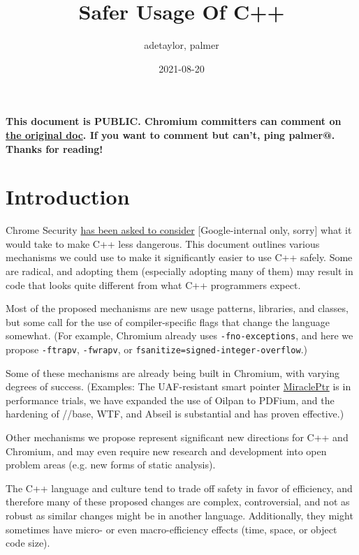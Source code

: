 \documentclass[a4paper,12pt,notitlepage,twoside,openright]{article}
\title{Safer Usage Of C++}
\author{adetaylor, palmer}
\date{2021-08-20}
\begin{document}
\maketitle

\textbf{This document is PUBLIC. Chromium committers can comment
on \href{https://www.google.com/url?q=https://docs.google.com/document/d/1eVKfIsPsEVDsBS24ErmuyjNy-9zSBzHgp4Sk6fs6OOI/edit\%23\&sa=D\&source=editors\&ust=1631944129012000\&usg=AOvVaw0F0RgfJgUo0h2Qa_7lRJLS}{the
original doc}. If you want to comment but can't, ping palmer@. Thanks
for reading!}

\section{Introduction}

Chrome
Security \href{https://www.google.com/url?q=https://docs.google.com/document/d/1JWGI-fkEsdRPpwPtS6x3siNtHX8cWoZeiWD6_y781ag/edit\&sa=D\&source=editors\&ust=1631944129014000\&usg=AOvVaw2-sNWSU4CBVsAbGowWToa-}{has
been asked to consider} {[}Google-internal only, sorry{]} what it would
take to make C++ less dangerous. This document outlines various
mechanisms we could use to make it significantly easier to use C++
safely. Some are radical, and adopting them (especially adopting many of
them) may result in code that looks quite different from what C++
programmers expect.

Most of the proposed mechanisms are new usage patterns, libraries, and
classes, but some call for the use of compiler-specific flags that
change the language somewhat. (For example, Chromium already
uses \texttt{-fno-exceptions}, and here we propose \texttt{-ftrapv}, \texttt{-fwrapv},
or \texttt{fsanitize=signed-integer-overflow}.)

Some of these mechanisms are already being built in Chromium, with
varying degrees of success. (Examples: The UAF-resistant smart
pointer \href{https://www.google.com/url?q=http://go/miracleptr\&sa=D\&source=editors\&ust=1631944129016000\&usg=AOvVaw2vE6RkE_iDu216o08aJNOu}{MiraclePtr} is
in performance trials, we have expanded the use of Oilpan to PDFium, and
the hardening of //base, WTF, and Abseil is substantial and has proven
effective.)

Other mechanisms we propose represent significant new directions for C++
and Chromium, and may even require new research and development into
open problem areas (e.g. new forms of static analysis).

The C++ language and culture tend to trade off safety in favor of
efficiency, and therefore many of these proposed changes are complex,
controversial, and not as robust as similar changes might be in another
language. Additionally, they might sometimes have micro- or even
macro-efficiency effects (time, space, or object code size).
\end{document}
